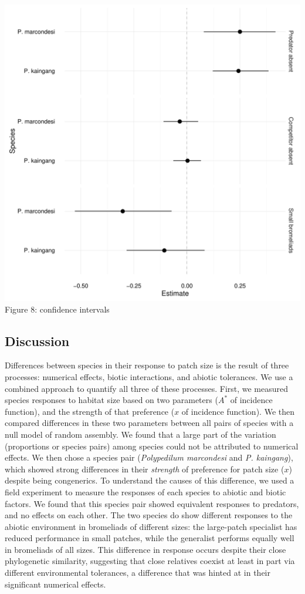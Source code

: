 \includegraphics[width=5.5in]{figures/confints.pdf} Figure 8: confidence
intervals\\

\subsection{Discussion}\label{discussion}

Differences between species in their response to patch size is the
result of three processes: numerical effects, biotic interactions, and
abiotic tolerances. We use a combined approach to quantify all three of
these processes. First, we measured species responses to habitat size
based on two parameters (\(A^{*}\) of incidence function), and the
strength of that preference (\(x\) of incidence function). We then
compared differences in these two parameters between all pairs of
species with a null model of random assembly. We found that a large part
of the variation (proportions or species pairs) among species could not
be attributed to numerical effects. We then chose a species pair
(\emph{Polypedilum marcondesi} and \emph{P. kaingang}), which showed
strong differences in their \emph{strength} of preference for patch size
(\(x\)) despite being congenerics. To understand the causes of this
difference, we used a field experiment to measure the responses of each
species to abiotic and biotic factors. We found that this species pair
showed equivalent responses to predators, and no effects on each other.
The two species do show different responses to the abiotic environment
in bromeliads of different sizes: the large-patch specialist has reduced
performance in small patches, while the generalist performs equally well
in bromeliads of all sizes. This difference in response occurs despite
their close phylogenetic similarity, suggesting that close relatives
coexist at least in part via different environmental tolerances, a
difference that was hinted at in their significant numerical effects.

